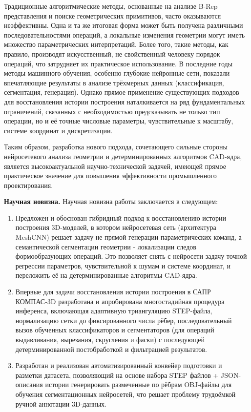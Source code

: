 Традиционные алгоритмические методы, основанные на анализе B-Rep представления и поиске геометрических примитивов, часто оказываются неэффективны. Одна и та же итоговая форма может быть получена различными последовательностями операций, а локальные изменения геометрии могут иметь множество параметрических интерпретаций. Более того, такие методы, как правило, производят искусственный, не свойственный человеку порядок операций, что затрудняет их практическое использование. В последние годы методы машинного обучения, особенно глубокие нейронные сети, показали впечатляющие результаты в анализе трёхмерных данных (классификация, сегментация, генерация). Однако прямое применение существующих подходов для восстановления истории построения наталкивается на ряд фундаментальных ограничений, связанных с необходимостью предсказывать не только тип операции, но и её точные числовые параметры, чувствительные к масштабу, системе координат и дискретизации.

Таким образом, разработка нового подхода, сочетающего сильные стороны нейросетевого анализа геометрии и детерминированных алгоритмов CAD-ядра, является высокоактуальной научно-технической задачей, имеющей прямое практическое значение для повышения эффективности промышленного проектирования.

\textbf{Научная новизна.} Научная новизна работы заключается в следующем:
\begin{enumerate}
    \item Предложен и обоснован гибридный подход к восстановлению истории построения 3D-моделей, в котором нейросетевая сеть (архитектура MeshCNN) решает задачу не прямой генерации параметрических команд, а семантической сегментации геометрии - локализации следов формообразующих операций. Это позволяет снять с нейросети задачу точной регрессии параметров, чувствительной к шумам и системе координат, и переложить её на детерминированные алгоритмы CAD-ядра.
    \item Впервые для задачи восстановления истории построения в САПР КОМПАС-3D разработана и апробирована многостадийная процедура инференса, включающая адаптивную триангуляцию STEP-файла, нормализацию сетки до фиксированного числа рёбер, последовательный вызов обученных классификаторов и сегментаторов (для операций выдавливания, вырезания, скругления и фаски) с последующей детерминированной постобработкой и фильтрацией результатов.
    \item Разработан и реализован автоматизированный конвейер подготовки и разметки датасета, позволяющий на основе набора STEP файлов + JSON-описания истории генерировать размеченные по рёбрам OBJ-файлы для обучения сегментационных нейросетей, что решает проблему трудоёмкой ручной аннотации 3D-данных.
\end{enumerate}

